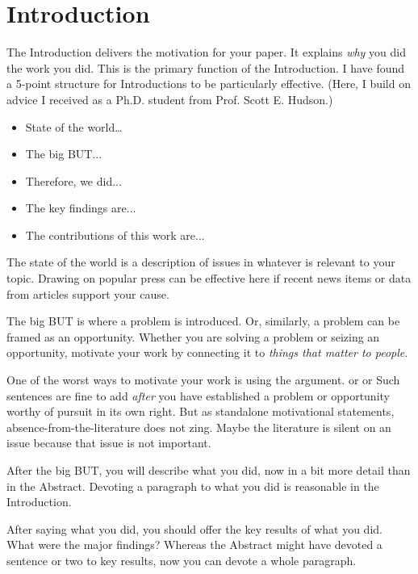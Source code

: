 \section{Introduction}
The Introduction delivers the motivation for your paper. 
It explains \emph{why} you did the work you did. 
This is the primary function of the Introduction.
I have found a 5-point structure for Introductions to be particularly effective. (Here, I build on advice I received as
a Ph.D. student from Prof. Scott E. Hudson.)

\begin{itemize}
    \item State of the world…
    \item The big BUT...
    \item Therefore, we did...
    \item The key findings are...
    \item The contributions of this work are...
\end{itemize}

The state of the world is a description of issues in whatever  is relevant to your topic. 
Drawing on popular press can be effective here if recent news items or data from articles support your cause.

The big BUT is where a problem is introduced.
Or, similarly, a problem can be framed as an opportunity. 
Whether you are solving a problem or seizing an opportunity, motivate your work by connecting it to \emph{things that matter to people}.

One of the worst ways to motivate your work is using the  argument. 
 or  or  
Such sentences are fine to add \emph{after} you have established a problem or opportunity worthy of pursuit in its own right. 
But as standalone motivational statements, absence-from-the-literature does not zing. 
Maybe the literature is silent on an issue
because that issue is not important.

After the big BUT, you will describe what you did, now in a bit more detail than in the Abstract. 
Devoting a paragraph to what you did is reasonable in the Introduction.

After saying what you did, you should offer the key results of what you did. 
What were the major findings? 
Whereas the Abstract might have devoted a sentence or two to key results, now you can devote a whole paragraph.

